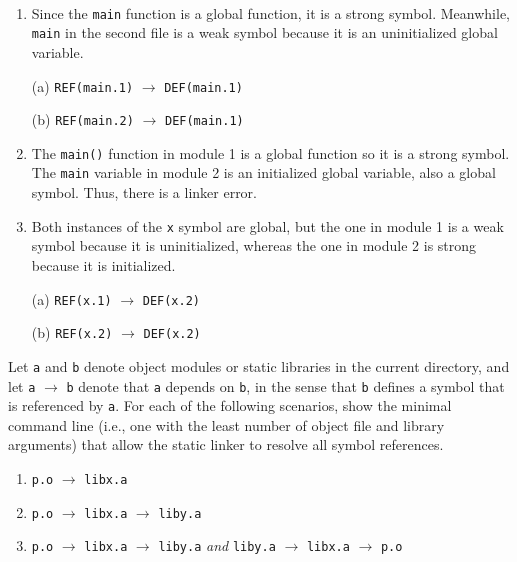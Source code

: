 \documentclass[12pt]{article}
\newenvironment{ex}[2][Exercise]{\begin{trivlist}
		\item[\hskip \labelsep {\bfseries #1}\hskip \labelsep {\bfseries #2.}]}{\end{trivlist}}
\newenvironment{sol}[1][Solution]{\begin{trivlist}
		\item[\hskip \labelsep {\bfseries #1:}]}{\end{trivlist}}
\begin{document}
\begin{sol}
	\
	\begin{enumerate}[label=(\alph*)]
		\item Since the \texttt{main} function is a global function, it is a strong symbol.
		Meanwhile, \texttt{main} in the second file is a weak symbol because it is an uninitialized
		global variable.
		
		(a) \texttt{REF(main.1)} $\to$ \texttt{DEF(main.1)}
		
		(b) \texttt{REF(main.2)} $\to$ \texttt{DEF(main.1)}
		\item The \texttt{main()} function in module 1 is a global function so it is a strong
		symbol. The \texttt{main} variable in module 2 is an initialized global variable, also
		a global symbol. Thus, there is a linker error.
		
		\item Both instances of the \texttt{x} symbol are global, but the one in module 1 is
		a weak symbol because it is uninitialized, whereas the one in module 2 is strong because it
		is initialized.
		
		(a) \texttt{REF(x.1)} $\to$ \texttt{DEF(x.2)}
		
		(b) \texttt{REF(x.2)} $\to$ \texttt{DEF(x.2)}
	\end{enumerate}
\end{sol}

\begin{ex}{7.3}
	Let \texttt{a} and \texttt{b} denote object modules or static libraries in the current directory,
	and let \texttt{a} $\to$ \texttt{b} denote that \texttt{a} depends on \texttt{b}, in the sense that
	\texttt{b} defines a symbol that is referenced by \texttt{a}. For each of the following scenarios,
	show the minimal command line (i.e., one with the least number of object file and library
	arguments) that allow the static linker to resolve all symbol references.
	\begin{enumerate}[label=(\alph*)]
		\item \texttt{p.o} $\to$ \texttt{libx.a}
		\item \texttt{p.o} $\to$ \texttt{libx.a} $\to$ \texttt{liby.a}
		\item \texttt{p.o} $\to$ \texttt{libx.a} $\to$ \texttt{liby.a}
		\emph{and}
		\texttt{liby.a} $\to$ \texttt{libx.a} $\to$ \texttt{p.o}
	\end{enumerate}
\end{ex}
\end{document}
